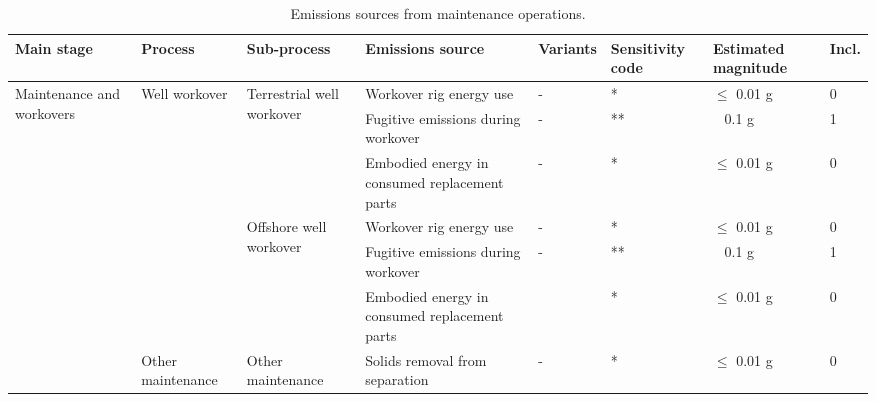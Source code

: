 \documentclass[11pt]{report}
\begin{document}
\begin{landscape}
\begin{table}
\begin{scriptsize}
\caption{Emissions sources from maintenance operations.}
\label{tab:maintenance_sources}
\begin{tabular}{|p{}|p{}|p{}|p{}|p{}|p{}|p{}|p{}|}
\hline
\textbf{Main stage} & \textbf{Process} & \textbf{Sub-process} & \textbf{Emissions source} & \textbf{Variants}& \textbf{Sensitivity code} & \textbf{Estimated magnitude} & \textbf{Incl.}\\
\hline
\multirow{7}{0.08\columnwidth}{Maintenance and workovers} & \multirow{6}{0.09\columnwidth}{Well workover} & \multirow{3}{0.12\columnwidth}{Terrestrial well workover} & Workover rig energy use & - & * & $\leq$ 0.01 g & 0\\
\cline{4-8}
& & & Fugitive emissions during workover & - & ** & ~ 0.1 g & 1\\
\cline{4-8}
& & & Embodied energy in consumed replacement parts & - & * & $\leq$ 0.01 g & 0\\
\cline{3-8}
& & \multirow{3}{0.12\columnwidth}{Offshore well workover} & Workover rig energy use & - & * & $\leq$ 0.01 g & 0\\
\cline{4-8}
& & & Fugitive emissions during workover & - & ** & ~ 0.1 g & 1\\
\cline{4-8}
& & & Embodied energy in consumed replacement parts & & * & $\leq$ 0.01 g & 0\\
\cline{2-8}
& Other maintenance & Other maintenance & Solids removal from separation & - & * & $\leq$ 0.01 g & 0\\
\hline
\end{tabular}
\end{scriptsize}
\end{table}



\end{landscape}
\end{document}
